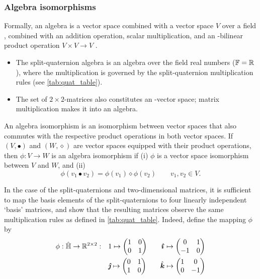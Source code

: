 \subsubsection{Algebra isomorphisms} Formally, an algebra is a vector space combined with a vector space \(V\) over a field \field, combined with an addition operation, scalar multiplication, and an \field-bilinear product operation \(V\times V \to V\) \cite{Schuller2014}.
\begin{itemize}
    \item The split-quaternion algebra is an algebra over the field real numbers (\(\mathbb{F} = \mathbb{R}\)), where the multiplication is governed by the split-quaternion multiplication rules (see \cref{tab:quat_table}).
    \item The set of \(2\times2\)-matrices also constitutes an \real-vector space; matrix multiplication makes it into an algebra.
\end{itemize}

An algebra isomorphism is an isomorphism between vector spaces that also commutes with the respective product operations in both vector spaces. If \((V, \bullet)\) and \((W, \diamond)\) are vector spaces equipped with their product operations, then \(\phi: V \to W\) is an algebra isomorphism if (i) \(\phi\) is a vector space isomorphism between \(V\) and \(W\), and (ii) \cite{Lang2002}
\begin{equation}
     \phi(v_1 \bullet v_2) = \phi(v_1)\diamond\phi(v_2) \qquad v_1, v_2 \in V.
\end{equation}

In the case of the split-quaternions and two-dimensional matrices, it is sufficient to map the basis elements of the split-quaternions to four linearly independent `basis' matrices, and show that the resulting matrices observe the same multiplication rules as defined in \cref{tab:quat_table}. Indeed, define the mapping \(\phi\) by 
\begin{equation}
    \begin{split}
        \phi: \spquaternions \to \real^{2\times2}: \quad &  
         1 \mapsto  \mqty(1 & 0 \\ 0 & 1) \qquad
        \quati \mapsto  \mqty(0 & 1 \\  -1 & 0) \\
        & \quatj \mapsto  \mqty(0 & 1 \\  1 & 0)\qquad 
        \quatk \mapsto  \mqty(1 & 0 \\  0 & -1) \\
    \end{split}
    \label{eq:basis_elements}
\end{equation}

